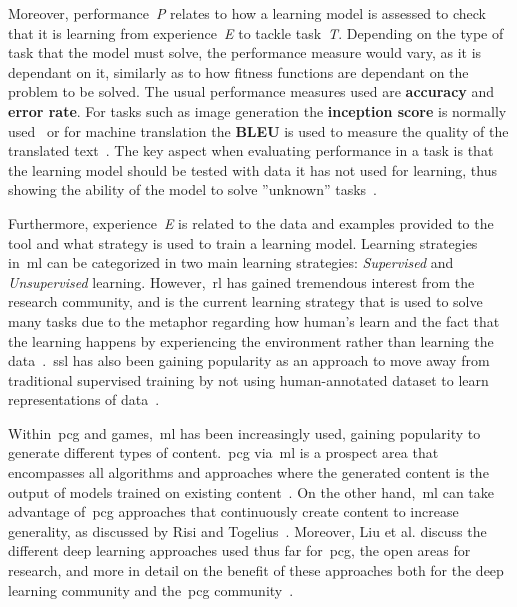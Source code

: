Moreover, performance~\textit{P} relates to how a learning model is assessed to check that it is learning from experience~\textit{E} to tackle task~\textit{T}. Depending on the type of task that the model must solve, the performance measure would vary, as it is dependant on it, similarly as to how fitness functions are dependant on the problem to be solved. The usual performance measures used are \textbf{accuracy} and \textbf{error rate}. For tasks such as image generation the \textbf{inception score} is normally used~\cite{salimans_improved_2016} or for machine translation the \textbf{BLEU} is used to measure the quality of the translated text~\cite{papineni_bleu_2002}. The key aspect when evaluating performance in a task is that the learning model should be tested with data it has not used for learning, thus showing the ability of the model to solve ''unknown'' tasks~\cite{goodfellow_deep_2016}. 

Furthermore, experience~\textit{E} is related to the data and examples provided to the tool and what strategy is used to train a learning model. Learning strategies in~\acrshort{ml} can be categorized in two main learning strategies: \emph{Supervised} and \emph{Unsupervised} learning. However,~\acrfull{rl} has gained tremendous interest from the research community, and is the current learning strategy that is used to solve many tasks due to the metaphor regarding how human's learn and the fact that the learning happens by experiencing the environment rather than learning the data~\cite{juliani_obstacle_2019}.~\acrfull{ssl} has also been gaining popularity as an approach to move away from traditional supervised training by not using human-annotated dataset to learn representations of data~\cite{doersch_multi-task_2017}.

Within~\acrlong{pcg} and games,~\acrshort{ml} has been increasingly used, gaining popularity to generate different types of content.~\acrshort{pcg} via~\acrshort{ml} is a prospect area that encompasses all algorithms and approaches where the generated content is the output of models trained on existing content~\cite{summerville_procedural_2018}. On the other hand,~\acrshort{ml} can take advantage of~\acrshort{pcg} approaches that continuously create content to increase generality, as discussed by Risi and Togelius~\cite{risi_increasing_2020}. Moreover, Liu et al. discuss the different deep learning approaches used thus far for~\acrshort{pcg}, the open areas for research, and more in detail on the benefit of these approaches both for the deep learning community and the~\acrshort{pcg} community~\cite{liu_deep_2020}.

